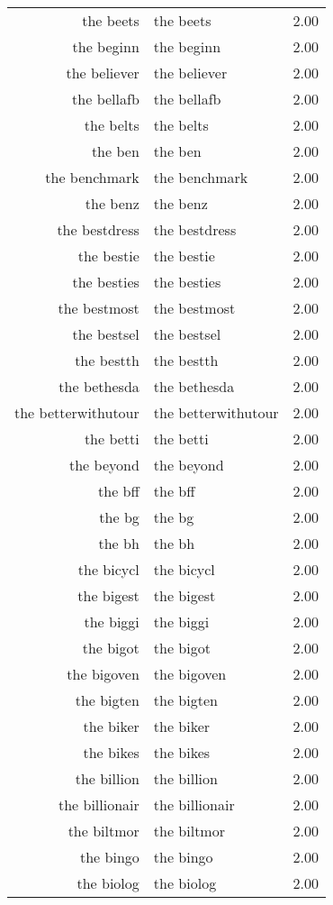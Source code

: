 \begin{table}[ht]
\begin{tabular}{rlr}
  the beets & the beets & 2.00 \\ 
  the beginn & the beginn & 2.00 \\ 
  the believer & the believer & 2.00 \\ 
  the bellafb & the bellafb & 2.00 \\ 
  the belts & the belts & 2.00 \\ 
  the ben & the ben & 2.00 \\ 
  the benchmark & the benchmark & 2.00 \\ 
  the benz & the benz & 2.00 \\ 
  the bestdress & the bestdress & 2.00 \\ 
  the bestie & the bestie & 2.00 \\ 
  the besties & the besties & 2.00 \\ 
  the bestmost & the bestmost & 2.00 \\ 
  the bestsel & the bestsel & 2.00 \\ 
  the bestth & the bestth & 2.00 \\ 
  the bethesda & the bethesda & 2.00 \\ 
  the betterwithutour & the betterwithutour & 2.00 \\ 
  the betti & the betti & 2.00 \\ 
  the beyond & the beyond & 2.00 \\ 
  the bff & the bff & 2.00 \\ 
  the bg & the bg & 2.00 \\ 
  the bh & the bh & 2.00 \\ 
  the bicycl & the bicycl & 2.00 \\ 
  the bigest & the bigest & 2.00 \\ 
  the biggi & the biggi & 2.00 \\ 
  the bigot & the bigot & 2.00 \\ 
  the bigoven & the bigoven & 2.00 \\ 
  the bigten & the bigten & 2.00 \\ 
  the biker & the biker & 2.00 \\ 
  the bikes & the bikes & 2.00 \\ 
  the billion & the billion & 2.00 \\ 
  the billionair & the billionair & 2.00 \\ 
  the biltmor & the biltmor & 2.00 \\ 
  the bingo & the bingo & 2.00 \\ 
  the biolog & the biolog & 2.00 \\ 

\end{tabular}
\end{table}
